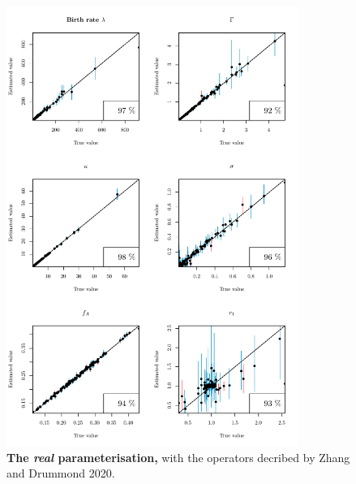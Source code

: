 \documentclass[12pt]{article}
\begin{document}
\begin{figure}[!htb]
\includegraphics[width=0.85\textwidth]{Figures/CalSim_real.pdf}
\caption{\textbf{The \textit{real} parameterisation,} with the operators decribed by Zhang and Drummond 2020.}
\label{fig:rateparams}
\end{figure}
\end{document}
